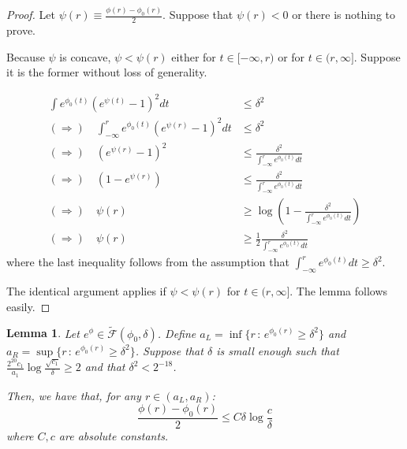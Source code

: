 \documentclass[12pt]{article}
\newtheorem{lemma}[theorem]{Lemma}
\begin{document}
\begin{proof}

  Let $\psi(r) \equiv \frac{\phi(r) - \phi_0(r)}{2}$. Suppose that $\psi(r) < 0$ or there is nothing to prove.

  Because $\psi$ is concave, $\psi < \psi(r)$ either for $t \in [-\infty, r)$ or for $t \in (r, \infty]$. Suppose it is the former without loss of generality.
  
  \begin{align*}
   \int e^{\phi_0(t)} (e^{\psi(t)} - 1)^2 dt &\leq \delta^2 \\
    (\Rightarrow) \quad \int_{-\infty}^r e^{\phi_0(t)} (e^{\psi(r)} - 1)^2 dt &\leq \delta^2 \\
    (\Rightarrow) \quad (e^{\psi(r)} - 1)^2 &\leq
                                              \frac{\delta^2}{\int_{-\infty}^r e^{\phi_0(t)}dt } \\
    (\Rightarrow) \quad (1 - e^{\psi(r)}) &\leq  \frac{\delta^2}{\int_{-\infty}^r e^{\phi_0(t)}dt } \\
    (\Rightarrow) \quad \psi(r) &\geq \log \left(
    1 -   \frac{\delta^2}{\int_{-\infty}^r e^{\phi_0(t)}dt } \right) \\
    (\Rightarrow) \quad \psi(r) &\geq \frac{1}{2} \frac{\delta^2}{\int_{-\infty}^r e^{\phi_0(t)}dt }
  \end{align*}
  where the last inequality follows from the assumption that $\int_{-\infty}^r e^{\phi_0(t)} dt \geq \delta^2$.

  The identical argument applies if $\psi < \psi(r)$ for $t \in (r, \infty]$. The lemma follows easily.
  
  
\end{proof}


\begin{lemma}
  \label{lem:envelope_upper_bound}
  Let $e^{\phi} \in \tilde{\mathcal{F}}(\phi_0, \delta)$. Define $a_L = \inf \{ r \,:\, e^{\phi_0(r)} \geq \delta^2\}$ and $a_R = \sup \{ r \,:\, e^{\phi_0(r)} \geq \delta^2\}$. Suppose that $\delta$ is small enough such that $\frac{2^{20} c_1}{a_1} \log \frac{\sqrt{c_1}}{\delta} \geq 2$ and that $\delta^2 < 2^{-18}$.
  

  Then, we have that, for any $r \in (a_L, a_R)$:
  \[
    \frac{\phi(r) - \phi_0(r)}{2} \leq  C \delta \log \frac{c}{\delta}
  \]
  where $C, c$ are absolute constants.

\end{lemma}
\end{document}
